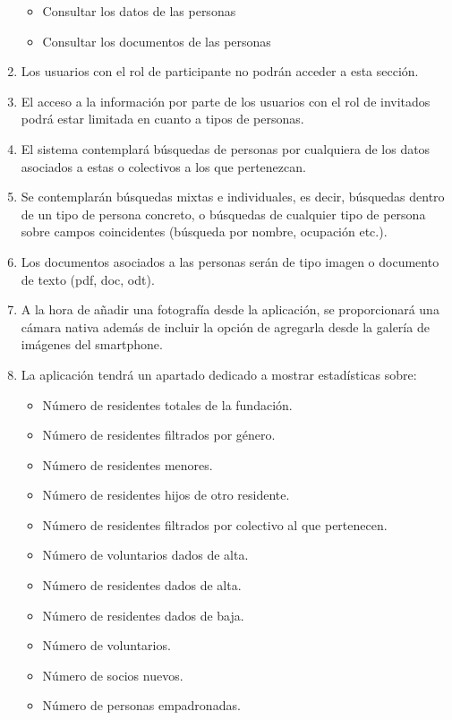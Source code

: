 \begin{enumerate}[start=9,label={RF-\arabic*.}]
\begin{itemize}
            \item Consultar los datos de las personas
            \item Consultar los documentos de las personas
        \end{itemize}
    \item Los usuarios con el rol de participante no podrán acceder a esta sección.
    \item El acceso a la información por parte de los usuarios con el rol de invitados podrá estar limitada en cuanto a tipos de personas.
    \item El sistema contemplará búsquedas de personas por cualquiera de los datos asociados a estas o colectivos a los que pertenezcan.
    \item Se contemplarán búsquedas mixtas e individuales, es decir, búsquedas dentro de un tipo de persona concreto, o búsquedas de cualquier tipo de persona sobre campos coincidentes (búsqueda por nombre, ocupación etc.).
    \item Los documentos asociados a las personas serán de tipo imagen o documento de texto (pdf, doc, odt).
    \item A la hora de añadir una fotografía desde la aplicación, se proporcionará una cámara nativa además de incluir la opción de agregarla desde la galería de imágenes del smartphone.
    \item \label{rf-es-personas} La aplicación tendrá un apartado dedicado a mostrar estadísticas sobre:
        \begin{itemize}
            \item Número de residentes totales de la fundación.
            \item Número de residentes filtrados por género.
            \item Número de residentes menores.
            \item Número de residentes hijos de otro residente.
            \item Número de residentes filtrados por colectivo al que pertenecen.
            \item Número de voluntarios dados de alta.
            \item Número de residentes dados de alta.
            \item Número de residentes dados de baja.
            \item Número de voluntarios.
            \item Número de socios nuevos.
            \item Número de personas empadronadas.

\end{itemize}
\end{enumerate}
